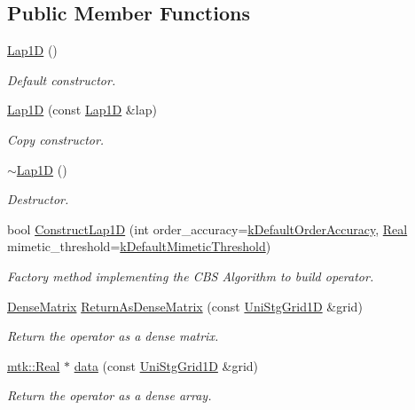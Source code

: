 \subsection*{Public Member Functions}
\begin{DoxyCompactItemize}
\item 
\hyperlink{classmtk_1_1Lap1D_a6fc2aeea35d4dfa49f17e625411f5a70}{Lap1\+D} ()
\begin{DoxyCompactList}\small\item\em Default constructor. \end{DoxyCompactList}\item 
\hyperlink{classmtk_1_1Lap1D_a95c3fdcd0c9e4c56e775a2a20a2fac42}{Lap1\+D} (const \hyperlink{classmtk_1_1Lap1D}{Lap1\+D} \&lap)
\begin{DoxyCompactList}\small\item\em Copy constructor. \end{DoxyCompactList}\item 
\hyperlink{classmtk_1_1Lap1D_ac0cb868243a66658cc46de5b818fa4e8}{$\sim$\+Lap1\+D} ()
\begin{DoxyCompactList}\small\item\em Destructor. \end{DoxyCompactList}\item 
bool \hyperlink{classmtk_1_1Lap1D_a685dcba88c08cf5b7b6c2aa4669a472c}{Construct\+Lap1\+D} (int order\+\_\+accuracy=\hyperlink{group__c01-roots_ga0d95560098eb36420511103637b6952f}{k\+Default\+Order\+Accuracy}, \hyperlink{group__c01-roots_gac080bbbf5cbb5502c9f00405f894857d}{Real} mimetic\+\_\+threshold=\hyperlink{group__c01-roots_ga35718d949bdc81a08a9cc8ebbe3478a2}{k\+Default\+Mimetic\+Threshold})
\begin{DoxyCompactList}\small\item\em Factory method implementing the C\+B\+S Algorithm to build operator. \end{DoxyCompactList}\item 
\hyperlink{classmtk_1_1DenseMatrix}{Dense\+Matrix} \hyperlink{classmtk_1_1Lap1D_a28672c735fa0d13e6204795b63aec4e2}{Return\+As\+Dense\+Matrix} (const \hyperlink{classmtk_1_1UniStgGrid1D}{Uni\+Stg\+Grid1\+D} \&grid)
\begin{DoxyCompactList}\small\item\em Return the operator as a dense matrix. \end{DoxyCompactList}\item 
\hyperlink{group__c01-roots_gac080bbbf5cbb5502c9f00405f894857d}{mtk\+::\+Real} $\ast$ \hyperlink{classmtk_1_1Lap1D_a8c3151d792efbe69f34cbb9b5ea870e9}{data} (const \hyperlink{classmtk_1_1UniStgGrid1D}{Uni\+Stg\+Grid1\+D} \&grid)
\begin{DoxyCompactList}\small\item\em Return the operator as a dense array. \end{DoxyCompactList}\end{DoxyCompactItemize}
